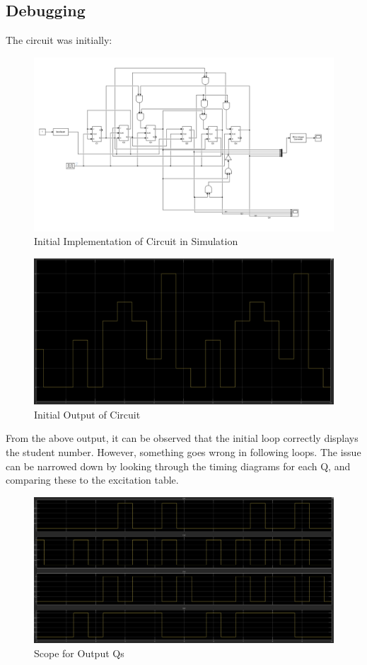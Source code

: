 \documentclass{article}
\begin{document}
\subsection{Debugging}
The circuit was initially:
\begin{figure}[!htb]
    \includegraphics[width=\textwidth]{SimCircV1.PNG}
    \caption{Initial Implementation of Circuit in Simulation}
\end{figure}
\newpage
\begin{figure}[!htb]
    \includegraphics[width=\textwidth]{OutputV1.PNG}
    \caption{Initial Output of Circuit}
\end{figure}
From the above output, it can be observed that the initial loop correctly displays the student number. However, something goes wrong 
in following loops. The issue can be narrowed down by looking through the timing diagrams for each Q, and comparing these to the 
excitation table.
\begin{figure}[!htb]
    \includegraphics[width=\textwidth]{QsCheck.PNG}
    \caption{Scope for Output Qs}
\end{figure}
\end{document}
